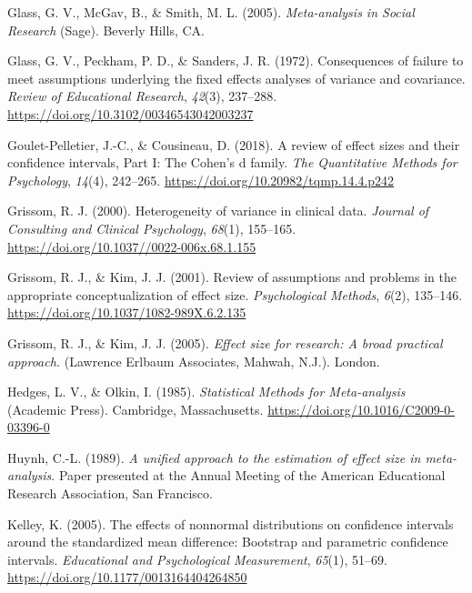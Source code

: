 \documentclass[
  english,
  man,floatsintext]{apa6}
\begin{document}
\leavevmode\hypertarget{ref-Glass_et_al_1981}{}%
Glass, G. V., McGav, B., \& Smith, M. L. (2005). \emph{Meta-analysis in Social Research} (Sage). Beverly Hills, CA.

\leavevmode\hypertarget{ref-Glass_et_al_1972}{}%
Glass, G. V., Peckham, P. D., \& Sanders, J. R. (1972). Consequences of failure to meet assumptions underlying the fixed effects analyses of variance and covariance. \emph{Review of Educational Research}, \emph{42}(3), 237--288. \url{https://doi.org/10.3102/00346543042003237}

\leavevmode\hypertarget{ref-Pelletier_Cousineau_2018}{}%
Goulet-Pelletier, J.-C., \& Cousineau, D. (2018). A review of effect sizes and their confidence intervals, Part I: The Cohen's d family. \emph{The Quantitative Methods for Psychology}, \emph{14}(4), 242--265. \url{https://doi.org/10.20982/tqmp.14.4.p242}

\leavevmode\hypertarget{ref-Grissom_2000}{}%
Grissom, R. J. (2000). Heterogeneity of variance in clinical data. \emph{Journal of Consulting and Clinical Psychology}, \emph{68}(1), 155--165. \url{https://doi.org/10.1037//0022-006x.68.1.155}

\leavevmode\hypertarget{ref-Grissom_Kim_2001}{}%
Grissom, R. J., \& Kim, J. J. (2001). Review of assumptions and problems in the appropriate conceptualization of effect size. \emph{Psychological Methods}, \emph{6}(2), 135--146. \url{https://doi.org/10.1037/1082-989X.6.2.135}

\leavevmode\hypertarget{ref-Grissom_and_kim_2005}{}%
Grissom, R. J., \& Kim, J. J. (2005). \emph{Effect size for research: A broad practical approach.} (Lawrence Erlbaum Associates, Mahwah, N.J.). London.

\leavevmode\hypertarget{ref-Hedges_Olkin_1985}{}%
Hedges, L. V., \& Olkin, I. (1985). \emph{Statistical Methods for Meta-analysis} (Academic Press). Cambridge, Massachusetts. \url{https://doi.org/10.1016/C2009-0-03396-0}

\leavevmode\hypertarget{ref-Huynh_1989}{}%
Huynh, C.-L. (1989). \emph{A unified approach to the estimation of effect size in meta-analysis}. Paper presented at the Annual Meeting of the American Educational Research Association, San Francisco.

\leavevmode\hypertarget{ref-Kelley_2005}{}%
Kelley, K. (2005). The effects of nonnormal distributions on confidence intervals around the standardized mean difference: Bootstrap and parametric confidence intervals. \emph{Educational and Psychological Measurement}, \emph{65}(1), 51--69. \url{https://doi.org/10.1177/0013164404264850}
\end{document}
